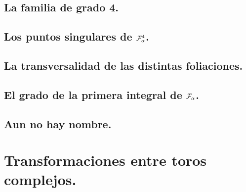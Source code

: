 \documentclass[10pt]{book}
\theoremstyle{definition}
\begin{document}
     	    

	\section{La familia de grado 4.}

     	    

  	\section{Los puntos singulares de $\Fol[4]{\alpha}$.}

     	       
     	    
     	    

        \section{La transversalidad de las distintas foliaciones.}

            
        \section{El grado de la primera integral de $\Foli_{\alpha}$.}    
                

        \section{Aun no hay nombre.}
        
\appendix
\chapter{Transformaciones entre toros complejos.}
\label{ApendiceToros}        
            


\end{document}
